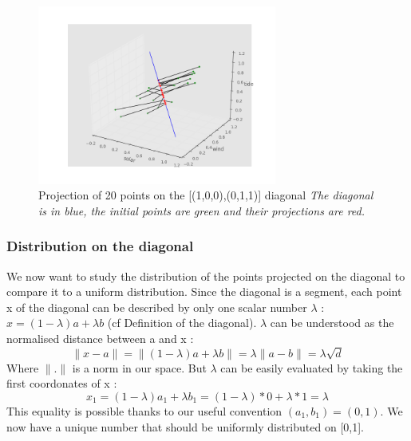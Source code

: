 \documentclass{article}
\begin{document}
	  \begin{figure}
  
    \includegraphics[width=0.7\textwidth]{proj3Ddiag2.png}
    \centering
    \caption{Projection of 20 points on the [(1,0,0),(0,1,1)] diagonal \emph{The diagonal is in blue, the initial points are green and their projections are red.}}
\end{figure}


	\subsubsection{Distribution on the diagonal}
	We now want to study the distribution of the points projected on the diagonal to compare it to a uniform distribution. Since the diagonal is a segment, each point x of the diagonal can be described by only one scalar number $\lambda$ : $x = (1-\lambda)a+\lambda b $ (cf Definition of the diagonal). \newline
	$\lambda$ can be understood as the normalised distance between a and x :
	\begin{equation*}
		\| x-a \|	= \| (1-\lambda)a+\lambda b\|
					= \lambda \| a - b \|
					= \lambda \sqrt{d} 
	\end{equation*}
Where $\| . \|$ is a norm in our space.\newline
\newline
But $\lambda$ can be easily evaluated by taking the first coordonates of x : 
	\begin{equation*}
		x_1 = (1-\lambda)a_1 + \lambda b_1 = (1-\lambda) *0 + \lambda *1 = \lambda 
	\end{equation*}
This equality is possible thanks to our useful convention $(a_1,b_1)= (0,1)$.\newline
\newline
We now have a unique number that should be uniformly distributed on [0,1].
\end{document}

